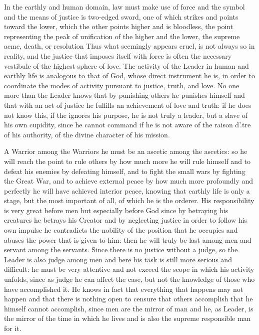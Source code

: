 In the earthly and human domain, law must make use of force and the symbol and the means of justice is two-edged sword, one of which strikes and points toward the lower, which the other points higher and is bloodless, the point representing the peak of unification of the higher and the lower, the supreme acme, death, or resolution Thus what seemingly appears cruel, is not always so in reality, and the justice that imposes itself with force is often the necessary vestibule of the highest sphere of love. The activity of the Leader in human and earthly life is analogous to that of God, whose direct instrument he is, in order to coordinate the modes of activity pursuant to justice, truth, and love. No one more than the Leader knows that by punishing others he punishes himself and that with an act of justice he fulfills an achievement of love and truth: if he does not know this, if the ignores his purpose, he is not truly a leader, but a slave of his own cupidity, since he cannot command if he is not aware of the raison d'.tre of his authority, of the divine character of his mission.

A Warrior among the Warriors he must be an ascetic among the ascetics: so he will reach the point to rule others by how much more he will rule himself and to defeat his enemies by defeating himself, and to fight the small wars by fighting the Great War, and to achieve external peace by how much more profoundly and perfectly he will have achieved interior peace, knowing that earthly life is only a stage, but the most important of all, of which he is the orderer. His responsibility is very great before men but especially before God since by betraying his creatures he betrays his Creator and by neglecting justice in order to follow his own impulse he contradicts the nobility of the position that he occupies and abuses the power that is given to him: then he will truly be last among men and servant among the servants. Since there is no justice without a judge, so the Leader is also judge among men and here his task is still more serious and difficult: he must be very attentive and not exceed the scope in which his activity unfolds, since as judge he can affect the case, but not the knowledge of those who have accomplished it. He knows in fact that everything that happens may not happen and that there is nothing open to censure that others accomplish that he himself cannot accomplish, since men are the mirror of man and he, as Leader, is the mirror of the time in which he lives and is also the supreme responsible man for it.

